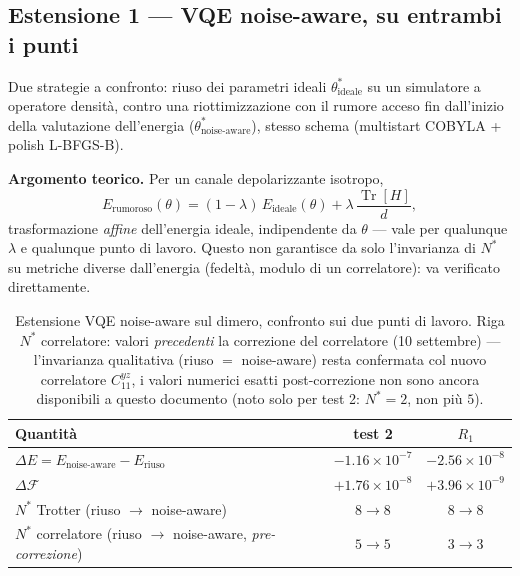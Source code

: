\documentclass[11pt,a4paper]{article}
\providecommand{\Tr}{\operatorname{Tr}}
\begin{document}
\subsection{Estensione 1 --- VQE noise-aware, su entrambi i punti}

Due strategie a confronto: riuso dei parametri ideali $\theta^*_\text{ideale}$
su un simulatore a operatore densità, contro una riottimizzazione con il
rumore acceso fin dall'inizio della valutazione dell'energia
($\theta^*_\text{noise-aware}$), stesso schema (multistart COBYLA + polish
L-BFGS-B).

\textbf{Argomento teorico.} Per un canale depolarizzante isotropo,
$$E_\text{rumoroso}(\theta) = (1-\lambda)\,E_\text{ideale}(\theta) +
\lambda\,\frac{\Tr[H]}{d},$$
trasformazione \emph{affine} dell'energia ideale, indipendente da $\theta$ ---
vale per qualunque $\lambda$ e qualunque punto di lavoro. Questo non
garantisce da solo l'invarianza di $N^*$ su metriche diverse dall'energia
(fedeltà, modulo di un correlatore): va verificato direttamente.

\begin{table}[htbp]
\centering
\caption{Estensione VQE noise-aware sul dimero, confronto sui due punti di
lavoro. Riga $N^*$ correlatore: valori \emph{precedenti} la correzione del
correlatore (10 settembre) --- l'invarianza qualitativa (riuso $=$
noise-aware) resta confermata col nuovo correlatore $C_{11}^{yz}$, i valori
numerici esatti post-correzione non sono ancora disponibili a questo
documento (noto solo per test 2: $N^*=2$, non più $5$).}
\label{tab:dimero-noiseaware}
\begin{tabular}{lcc}
\toprule
Quantità & test 2 & $R_1$ \\
\midrule
$\Delta E = E_\text{noise-aware} - E_\text{riuso}$ & $-1.16\times10^{-7}$ & $-2.56\times10^{-8}$ \\
$\Delta \mathcal F$ & $+1.76\times10^{-8}$ & $+3.96\times10^{-9}$ \\
$N^*$ Trotter (riuso $\to$ noise-aware) & $8\to8$ & $8\to8$ \\
$N^*$ correlatore (riuso $\to$ noise-aware, \emph{pre-correzione}) & $5\to5$ & $3\to3$ \\
\bottomrule
\end{tabular}
\end{table}

\end{document}
